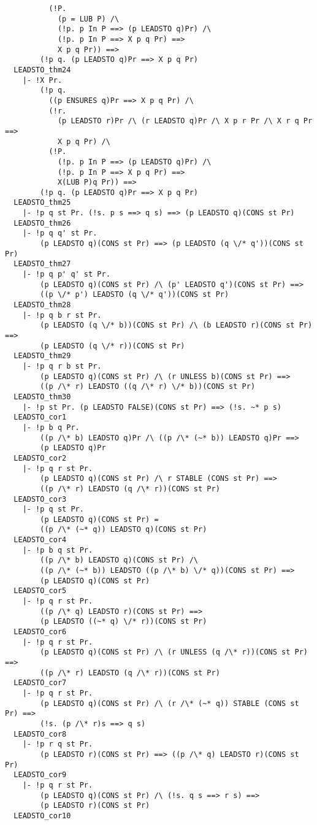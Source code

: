 {\begin{verbatim}
          (!P.
            (p = LUB P) /\
            (!p. p In P ==> (p LEADSTO q)Pr) /\
            (!p. p In P ==> X p q Pr) ==>
            X p q Pr)) ==>
        (!p q. (p LEADSTO q)Pr ==> X p q Pr)
  LEADSTO_thm24
    |- !X Pr.
        (!p q.
          ((p ENSURES q)Pr ==> X p q Pr) /\
          (!r.
            (p LEADSTO r)Pr /\ (r LEADSTO q)Pr /\ X p r Pr /\ X r q Pr ==>
            X p q Pr) /\
          (!P.
            (!p. p In P ==> (p LEADSTO q)Pr) /\
            (!p. p In P ==> X p q Pr) ==>
            X(LUB P)q Pr)) ==>
        (!p q. (p LEADSTO q)Pr ==> X p q Pr)
  LEADSTO_thm25
    |- !p q st Pr. (!s. p s ==> q s) ==> (p LEADSTO q)(CONS st Pr)
  LEADSTO_thm26
    |- !p q q' st Pr.
        (p LEADSTO q)(CONS st Pr) ==> (p LEADSTO (q \/* q'))(CONS st Pr)
  LEADSTO_thm27
    |- !p q p' q' st Pr.
        (p LEADSTO q)(CONS st Pr) /\ (p' LEADSTO q')(CONS st Pr) ==>
        ((p \/* p') LEADSTO (q \/* q'))(CONS st Pr)
  LEADSTO_thm28
    |- !p q b r st Pr.
        (p LEADSTO (q \/* b))(CONS st Pr) /\ (b LEADSTO r)(CONS st Pr) ==>
        (p LEADSTO (q \/* r))(CONS st Pr)
  LEADSTO_thm29
    |- !p q r b st Pr.
        (p LEADSTO q)(CONS st Pr) /\ (r UNLESS b)(CONS st Pr) ==>
        ((p /\* r) LEADSTO ((q /\* r) \/* b))(CONS st Pr)
  LEADSTO_thm30
    |- !p st Pr. (p LEADSTO FALSE)(CONS st Pr) ==> (!s. ~* p s)
  LEADSTO_cor1
    |- !p b q Pr.
        ((p /\* b) LEADSTO q)Pr /\ ((p /\* (~* b)) LEADSTO q)Pr ==>
        (p LEADSTO q)Pr
  LEADSTO_cor2
    |- !p q r st Pr.
        (p LEADSTO q)(CONS st Pr) /\ r STABLE (CONS st Pr) ==>
        ((p /\* r) LEADSTO (q /\* r))(CONS st Pr)
  LEADSTO_cor3
    |- !p q st Pr.
        (p LEADSTO q)(CONS st Pr) =
        ((p /\* (~* q)) LEADSTO q)(CONS st Pr)
  LEADSTO_cor4
    |- !p b q st Pr.
        ((p /\* b) LEADSTO q)(CONS st Pr) /\
        ((p /\* (~* b)) LEADSTO ((p /\* b) \/* q))(CONS st Pr) ==>
        (p LEADSTO q)(CONS st Pr)
  LEADSTO_cor5
    |- !p q r st Pr.
        ((p /\* q) LEADSTO r)(CONS st Pr) ==>
        (p LEADSTO ((~* q) \/* r))(CONS st Pr)
  LEADSTO_cor6
    |- !p q r st Pr.
        (p LEADSTO q)(CONS st Pr) /\ (r UNLESS (q /\* r))(CONS st Pr) ==>
        ((p /\* r) LEADSTO (q /\* r))(CONS st Pr)
  LEADSTO_cor7
    |- !p q r st Pr.
        (p LEADSTO q)(CONS st Pr) /\ (r /\* (~* q)) STABLE (CONS st Pr) ==>
        (!s. (p /\* r)s ==> q s)
  LEADSTO_cor8
    |- !p r q st Pr.
        (p LEADSTO r)(CONS st Pr) ==> ((p /\* q) LEADSTO r)(CONS st Pr)
  LEADSTO_cor9
    |- !p q r st Pr.
        (p LEADSTO q)(CONS st Pr) /\ (!s. q s ==> r s) ==>
        (p LEADSTO r)(CONS st Pr)
  LEADSTO_cor10

\end{verbatim}}
